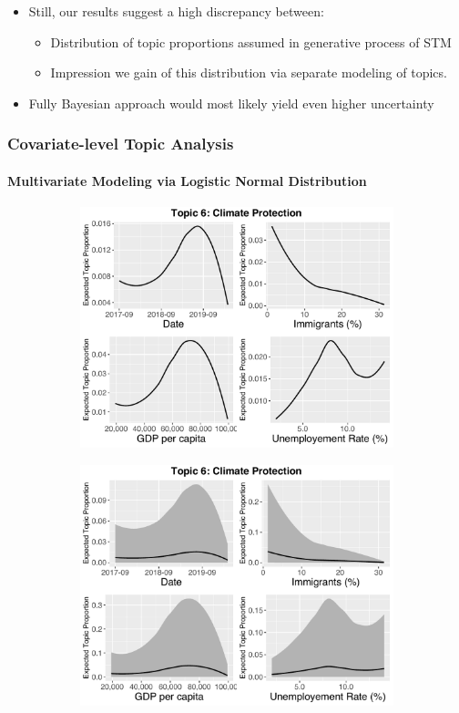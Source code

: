 \documentclass[xcolor=dvipsnames]{beamer}
\begin{document}
\begin{frame}
\begin{itemize}
\item Still, our results suggest a high discrepancy between:
\begin{itemize}
\item Distribution of topic proportions assumed in generative process of STM
\item Impression we gain of this distribution via separate modeling of topics.
\end{itemize}
\item Fully Bayesian approach would most likely yield even higher uncertainty
\end{itemize}
\frametitle{Covariate-level Topic Analysis}
\framesubtitle{Multivariate Modeling via Logistic Normal Distribution}
\begin{figure}[h!]
  \centering
  \captionsetup{justification=centering}
  \begin{subfigure}[b]{0.4\linewidth}
    \includegraphics[width=\linewidth]{../../plots/presentation/direct_t6_without_credible.pdf}
  \end{subfigure}
  \begin{subfigure}[b]{0.4\linewidth}
    \includegraphics[width=\linewidth]{../../plots/presentation/direct_t6_with_credible.pdf}

\end{subfigure}
\end{figure}
\end{frame}
\end{document}
